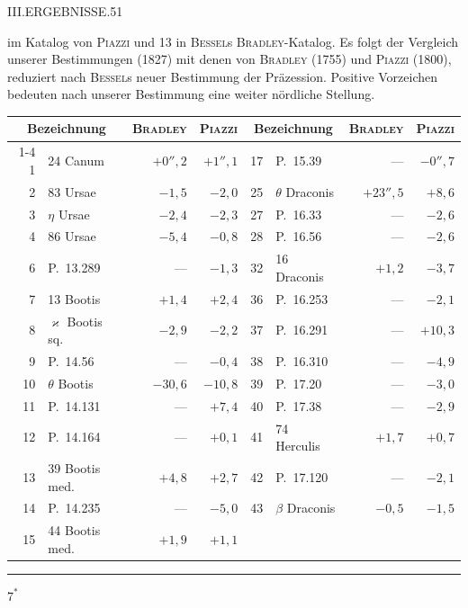 \clearpage
\noindent\mbox{}\hfill III.\quad ERGEBNISSE.\hfill 51\par
{} im Katalog von \textsc{Piazzi} und 13 in \textsc{Bessel}s \textsc{Bradley}-Katalog. Es folgt der Vergleich unserer Bestimmungen (1827) mit denen von \textsc{Bradley} (1755) und \textsc{Piazzi} (1800), reduziert nach \textsc{Bessel}s neuer Bestimmung der Präzession. Positive Vorzeichen bedeuten nach unserer Bestimmung eine weiter nördliche Stellung.
\begin{center}
{\small\setlength{\tabcolsep}{4pt}
\begin{tabular}{r|l|r|r||r|l|r|r}
\multicolumn{2}{c|}{Bezeichnung}&\textsc{Bradley}&\textsc{Piazzi}&\multicolumn{2}{c|}{Bezeichnung}&\textsc{Bradley}&\textsc{Piazzi}\\\cline{1-4}\cline{5-8}
1&24 Canum&$+0''{,}2$&$+1''{,}1$&17&P.\ 15.39&—&$-0''{,}7$\\
2&83 Ursae&$-1{,}5$&$-2{,}0$&25&$\theta$ Draconis&$+23''{,}5$&$+8{,}6$\\
3&$\eta$ Ursae&$-2{,}4$&$-2{,}3$&27&P.\ 16.33&—&$-2{,}6$\\
4&86 Ursae&$-5{,}4$&$-0{,}8$&28&P.\ 16.56&—&$-2{,}6$\\
6&P.\ 13.289&—&$-1{,}3$&32&16 Draconis&$+1{,}2$&$-3{,}7$\\
7&13 Bootis&$+1{,}4$&$+2{,}4$&36&P.\ 16.253&—&$-2{,}1$\\
8&$\varkappa$ Bootis sq.&$-2{,}9$&$-2{,}2$&37&P.\ 16.291&—&$+10{,}3$\\
9&P.\ 14.56&—&$-0{,}4$&38&P.\ 16.310&—&$-4{,}9$\\
10&$\theta$ Bootis&$-30{,}6$&$-10{,}8$&39&P.\ 17.20&—&$-3{,}0$\\
11&P.\ 14.131&—&$+7{,}4$&40&P.\ 17.38&—&$-2{,}9$\\
12&P.\ 14.164&—&$+0{,}1$&41&74 Herculis&$+1{,}7$&$+0{,}7$\\
13&39 Bootis med.&$+4{,}8$&$+2{,}7$&42&P.\ 17.120&—&$-2{,}1$\\
14&P.\ 14.235&—&$-5{,}0$&43&$\beta$ Draconis&$-0{,}5$&$-1{,}5$\\
15&44 Bootis med.&$+1{,}9$&$+1{,}1$&&&&
\end{tabular}}
\end{center}
\vspace{14mm}
\begin{center}\rule{.25\textwidth}{.4pt}\end{center}
\noindent\hfill $7^*$\par

